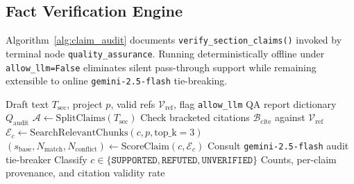 \documentclass[conference]{IEEEtran}
\begin{document}
\subsection{Fact Verification Engine}
Algorithm~\ref{alg:claim_audit} documents \texttt{verify\_section\_claims()} invoked by terminal node \texttt{quality\_assurance}. Running deterministically offline under \texttt{allow\_llm=False} eliminates silent pass-through support while remaining extensible to online \texttt{gemini-2.5-flash} tie-breaking.

\begin{algorithm}[t]
\caption{Post-Draft Claim and Citation Audit (\texttt{claim\_verifier.py})}
\label{alg:claim_audit}
\footnotesize
\begin{algorithmic}[1]
\Require Draft text $T_{\text{sec}}$, project $p$, valid refs $\mathcal{V}_{\text{ref}}$, flag \texttt{allow\_llm}
\Ensure QA report dictionary $Q_{\text{audit}}$
\State $\mathcal{A} \gets \text{SplitClaims}(T_{\text{sec}})$
\State Check bracketed citations $\mathcal{B}_{\text{cite}}$ against $\mathcal{V}_{\text{ref}}$
  \State $\mathcal{E}_c \gets \text{SearchRelevantChunks}(c, p, \text{top\_k}{=}3)$
  \State $(s_{\text{base}}, N_{\text{match}}, N_{\text{conflict}}) \gets \text{ScoreClaim}(c, \mathcal{E}_c)$
    \State Consult \texttt{gemini-2.5-flash} audit tie-breaker
  \EndIf
  \State Classify $c \in \{\texttt{SUPPORTED}, \texttt{REFUTED}, \texttt{UNVERIFIED}\}$
\EndFor
\State \Return Counts, per-claim provenance, and citation validity rate
\end{algorithmic}
\end{algorithm}
\end{document}
